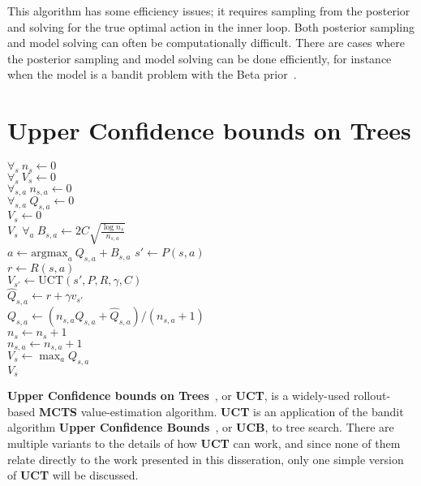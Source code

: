 This algorithm has some efficiency issues; it requires sampling from the posterior and solving for the true optimal action in the inner loop. Both posterior sampling and model solving can often be computationally difficult. There are cases where the posterior sampling and model solving can be done efficiently, for instance when the model is a bandit problem with the Beta prior~\cite{wang05}.


\section{Upper Confidence bounds on Trees}

\begin{algorithm}[tb]
	\caption{$\mbox{UCT}(s, P, R, \gamma, C)$}
	\label{alg:uct}
	$\forall_{s} ~ n_{s} \leftarrow 0$\\
	$\forall_{s} ~ V_{s} \leftarrow 0$\\
	$\forall_{s,a} ~ n_{s,a} \leftarrow 0$\\
	$\forall_{s,a} ~ Q_{s,a} \leftarrow 0$\\

	 {
		$V_s \leftarrow 0$\\
		\Return $V_s$
	}
	 {
		$\forall_a ~ B_{s,a} \leftarrow 2 C \sqrt{\frac{\log n_{s}}{n_{s,a}}}$\\
		$a \leftarrow \mbox{argmax}_a ~ Q_{s,a}+B_{s,a}$
	}
	$s' \leftarrow P(s,a)$\\
	$r \leftarrow R(s,a)$\\
	$V_{s'} \leftarrow \mbox{UCT}(s', P, R, \gamma, C)$\\
	$\hat Q_{s,a} \leftarrow r+\gamma v_{s'}$\\
	$Q_{s,a} \leftarrow (n_{s,a}Q_{s,a}+\hat Q_{s,a})/(n_{s,a}+1)$\\
	$n_s \leftarrow n_s+1$\\
	$n_{s,a} \leftarrow n_{s,a}+1$\\
	$V_s \leftarrow \max_a Q_{s,a}$\\
	\Return $V_s$
\end{algorithm}

{\bf Upper Confidence bounds on Trees}~\cite{kocsis06}, or {\bf UCT}, is a widely-used rollout-based {\bf MCTS} value-estimation algorithm. {\bf UCT} is an application of the bandit algorithm {\bf Upper Confidence Bounds}~\cite{auer02}, or {\bf UCB}, to tree search. There are multiple variants to the details of how {\bf UCT} can work, and since none of them relate directly to the work presented in this disseration, only one simple version of {\bf UCT} will be discussed.

